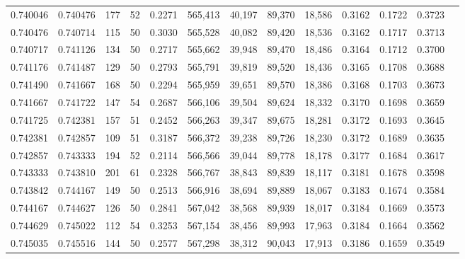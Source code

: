 \begin{tabular}{rrrrrrrrrrrrr}
0.740046 & 0.740476 &    177 &    52 &                                     0.2271 & 565,413 &  40,197 &  89,370 &  18,586 & 0.3162 & 0.1722 & 0.3723 \\
0.740476 & 0.740714 &    115 &    50 &                                     0.3030 & 565,528 &  40,082 &  89,420 &  18,536 & 0.3162 & 0.1717 & 0.3713 \\
0.740717 & 0.741126 &    134 &    50 &                                     0.2717 & 565,662 &  39,948 &  89,470 &  18,486 & 0.3164 & 0.1712 & 0.3700 \\
0.741176 & 0.741487 &    129 &    50 &                                     0.2793 & 565,791 &  39,819 &  89,520 &  18,436 & 0.3165 & 0.1708 & 0.3688 \\
0.741490 & 0.741667 &    168 &    50 &                                     0.2294 & 565,959 &  39,651 &  89,570 &  18,386 & 0.3168 & 0.1703 & 0.3673 \\
0.741667 & 0.741722 &    147 &    54 &                                     0.2687 & 566,106 &  39,504 &  89,624 &  18,332 & 0.3170 & 0.1698 & 0.3659 \\
0.741725 & 0.742381 &    157 &    51 &                                     0.2452 & 566,263 &  39,347 &  89,675 &  18,281 & 0.3172 & 0.1693 & 0.3645 \\
0.742381 & 0.742857 &    109 &    51 &                                     0.3187 & 566,372 &  39,238 &  89,726 &  18,230 & 0.3172 & 0.1689 & 0.3635 \\
0.742857 & 0.743333 &    194 &    52 &                                     0.2114 & 566,566 &  39,044 &  89,778 &  18,178 & 0.3177 & 0.1684 & 0.3617 \\
0.743333 & 0.743810 &    201 &    61 &                                     0.2328 & 566,767 &  38,843 &  89,839 &  18,117 & 0.3181 & 0.1678 & 0.3598 \\
0.743842 & 0.744167 &    149 &    50 &                                     0.2513 & 566,916 &  38,694 &  89,889 &  18,067 & 0.3183 & 0.1674 & 0.3584 \\
0.744167 & 0.744627 &    126 &    50 &                                     0.2841 & 567,042 &  38,568 &  89,939 &  18,017 & 0.3184 & 0.1669 & 0.3573 \\
0.744629 & 0.745022 &    112 &    54 &                                     0.3253 & 567,154 &  38,456 &  89,993 &  17,963 & 0.3184 & 0.1664 & 0.3562 \\
0.745035 & 0.745516 &    144 &    50 &                                     0.2577 & 567,298 &  38,312 &  90,043 &  17,913 & 0.3186 & 0.1659 & 0.3549 \\

\end{tabular}
